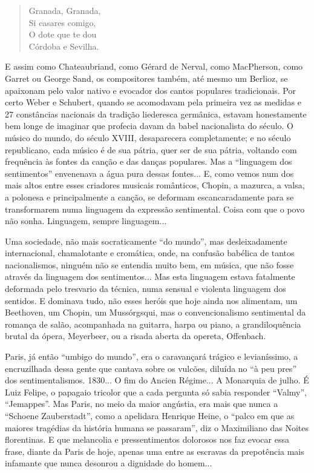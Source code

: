 \begin{verse}
Granada, Granada,\\
Si casares comigo,\\
O dote que te dou\\
Córdoba e Sevilha.
\end{verse}

E assim como Chateaubriand, como Gérard de Nerval, como MacPherson, como
Garret ou George Sand, os compositores também, até mesmo um Berlioz, se
apaixonam pelo valor nativo e evocador dos cantos populares
tradicionais. Por certo Weber e Schubert, quando se acomodavam pela
primeira vez as medidas e 27 constâncias nacionais da tradição
liederesca germânica, estavam honestamente bem longe de imaginar que
profecia davam da babel nacionalista do século. O músico do mundo, do
século XVIII, desaparecera completamente; e no século republicano, cada
músico é de sua pátria, quer ser de sua pátria, voltando com frequência
às fontes da canção e das danças populares. Mas a ``linguagem dos
sentimentos'' envenenava a água pura dessas fontes... E, como vemos num
dos mais altos entre esses criadores musicais românticos, Chopin, a
mazurca, a valsa, a polonesa e principalmente a canção, se deformam
escancaradamente para se transformarem numa linguagem da expressão
sentimental. Coisa com que o povo não sonha. Linguagem, sempre
linguagem...

Uma sociedade, não mais socraticamente ``do mundo'', mas desleixadamente
internacional, chamalotante e cromática, onde, na confusão babélica de
tantos nacionalismos, ninguém não se entendia muito bem, em música, que
não fosse através da linguagem dos sentimentos... Mas esta linguagem
estava fatalmente deformada pelo tresvario da técnica, numa sensual e
violenta linguagem dos sentidos. E dominava tudo, não esses heróis que
hoje ainda nos alimentam, um Beethoven, um Chopin, um Mussórgsqui, mas o
convencionalismo sentimental da romança de salão, acompanhada na
guitarra, harpa ou piano, a grandiloquência brutal da ópera, Meyerbeer,
ou a risada aberta da opereta, Offenbach.

Paris, já então ``umbigo do mundo'', era o caravançará trágico e
levianíssimo, a encruzilhada dessa gente que cantava sobre os vulcões,
diluída no ``à peu pres'' dos sentimentalismos. 1830... O fim do Ancien
Régime... A Monarquia de julho. É Luiz Felipe, o papagaio tricolor que a
cada pergunta só sabia responder ``Valmy'', ``Jemappes''. Mas Paris, no
meio da maior angústia, era mais que nunca a ``Schoene Zauberstadt'',
como a apelidara Henrique Heine, o ``palco em que as maiores tragédias
da história humana se passaram'', diz o Maximiliano das Noites
florentinas. E que melancolia e pressentimentos dolorosos nos faz evocar
essa frase, diante da Paris de hoje, apenas uma entre as escravas da
prepotência mais infamante que nunca desonrou a dignidade do homem...

